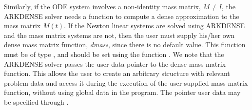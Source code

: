 \documentclass[letterpaper,10pt,english]{sphinxmanual}
\begin{document}
Similarly, if the ODE system involves a non-identity mass matrix,
\(M\ne I\), the ARKDENSE solver needs a function to compute a
dense approximation to the mass matrix \(M(t)\). If the Newton
linear systems are solved using ARKDENSE and the mass matrix systems
are not, then the user must supply his/her own dense mass matrix
function, \emph{dmass}, since there is no default value.  This function
must be of type {\hyperref[c_interface/User_supplied:c.ARKDlsDenseMassFn]{\emph{}}}, and should be set using
the function {\hyperref[c_interface/User_callable:c.ARKDlsSetDenseMassFn]{\emph{}}}.  We note that the
ARKDENSE solver passes the user data pointer to the dense mass matrix
function. This allows the user to create an arbitrary structure with
relevant problem data and access it during the execution of the
user-supplied mass matrix function, without using global data in the
program. The pointer user data may be specified through
{\hyperref[c_interface/User_callable:c.ARKodeSetUserData]{\emph{}}}.
\end{document}
